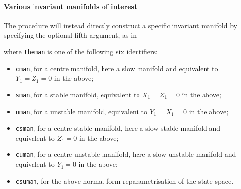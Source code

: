 \paragraph{Various invariant manifolds of interest}
The procedure will instead directly construct a specific
invariant manifold by specifying the optional fifth
argument, as in
where \verb|theman| is one of the following six identifiers:
\begin{itemize}
\item \verb|cman|, for a centre manifold, here a slow
manifold and equivalent to \(Y_1=Z_1=0\) in the above;
\item \verb|sman|, for a stable manifold, equivalent to
\(X_1=Z_1=0\) in the above;
\item \verb|uman|, for a unstable manifold, equivalent to
\(Y_1=X_1=0\) in the above;
\item \verb|csman|, for a centre-stable manifold, here a
slow-stable manifold and equivalent to \(Z_1=0\) in the
above;
\item \verb|cuman|, for a centre-unstable manifold, here a
slow-unstable manifold and equivalent to \(Y_1=0\) in the
above;
\item \verb|csuman|, for the above normal form
reparametrisation of the state space.
\end{itemize}


